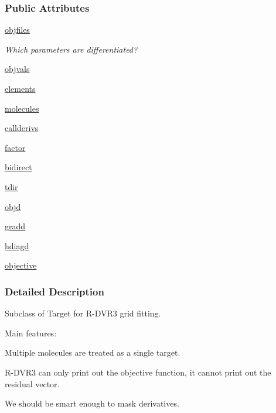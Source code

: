 \subsubsection*{Public Attributes}
\begin{DoxyCompactItemize}
\item 
\hyperlink{classsrc_1_1psi4io_1_1RDVR3__Psi4_ad85ec673d9220de23817e40075f5d2be}{objfiles}
\begin{DoxyCompactList}\small\item\em Which parameters are differentiated? \end{DoxyCompactList}\item 
\hyperlink{classsrc_1_1psi4io_1_1RDVR3__Psi4_a60c43d0d5a864d47421fd3d184815400}{objvals}
\item 
\hyperlink{classsrc_1_1psi4io_1_1RDVR3__Psi4_a783dcf33c771f9b91e59b02c86992d15}{elements}
\item 
\hyperlink{classsrc_1_1psi4io_1_1RDVR3__Psi4_ae81122d2379aa7662e497bf7b297a806}{molecules}
\item 
\hyperlink{classsrc_1_1psi4io_1_1RDVR3__Psi4_a969d0c1166f45a193539b831b191dfb4}{callderivs}
\item 
\hyperlink{classsrc_1_1psi4io_1_1RDVR3__Psi4_a9142db3047f520ef90e452755e12cbd2}{factor}
\item 
\hyperlink{classsrc_1_1psi4io_1_1RDVR3__Psi4_a843184b4cd705906a731bcb93b860f5a}{bidirect}
\item 
\hyperlink{classsrc_1_1psi4io_1_1RDVR3__Psi4_a2648992726bc3635d52c3902c11990f8}{tdir}
\item 
\hyperlink{classsrc_1_1psi4io_1_1RDVR3__Psi4_ae0fbbdcbde04025b429f2cf9a1a91d02}{objd}
\item 
\hyperlink{classsrc_1_1psi4io_1_1RDVR3__Psi4_a659934765e7695acc592eb8da60cb4de}{gradd}
\item 
\hyperlink{classsrc_1_1psi4io_1_1RDVR3__Psi4_ad47e40b30c3e97feb1b9933fedc78432}{hdiagd}
\item 
\hyperlink{classsrc_1_1psi4io_1_1RDVR3__Psi4_aee6a9ac7c958ce091beff18edcfb4c72}{objective}
\end{DoxyCompactItemize}


\subsubsection{Detailed Description}
Subclass of Target for R-\/\+D\+V\+R3 grid fitting. 

Main features\+:
\begin{DoxyItemize}
\item Multiple molecules are treated as a single target.
\item R-\/\+D\+V\+R3 can only print out the objective function, it cannot print out the residual vector.
\item We should be smart enough to mask derivatives. 
\end{DoxyItemize}


